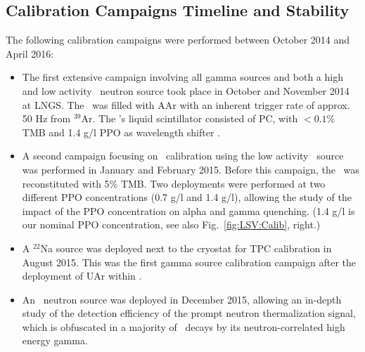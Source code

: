 

\subsection{Calibration Campaigns Timeline and Stability}
The following calibration campaigns were performed between October 2014 and April 2016:
\begin{itemize}
\item The first extensive campaign involving all gamma sources and both a high and low activity \AmBe\ neutron source took place in October and November 2014 at LNGS. The \tpc\ was filled with AAr with an inherent trigger rate of approx. 50 Hz from $^{39}$Ar. The \lsv's liquid scintillator consisted of PC, with $<0.1 \%$ TMB and 1.4 g/l PPO as wavelength shifter \cite{Agnes:2015qyz}.

\item A second campaign focusing on \lsv\ calibration using the low activity \AmBe\ source was performed in January and February 2015. Before this campaign, the \lsv\ was reconstituted with 5\% TMB. Two deployments were performed at two different PPO concentrations (0.7 g/l and 1.4 g/l), allowing the study of the impact of the PPO concentration on alpha and gamma quenching. (1.4 g/l is our nominal PPO concentration, see also Fig.~\ref{fig:LSV:Calib}, right.)
\item A $^{22}$Na source was deployed next to the cryostat for TPC calibration in August 2015. This was the first gamma source calibration campaign after the deployment of UAr within \dsf.
\item An \AmC\ neutron source was deployed in December 2015, allowing an in-depth study of the detection efficiency of the prompt neutron thermalization signal, which is obfuscated in a majority of \AmBe\ decays by its neutron-correlated high energy gamma.
\end{itemize}

